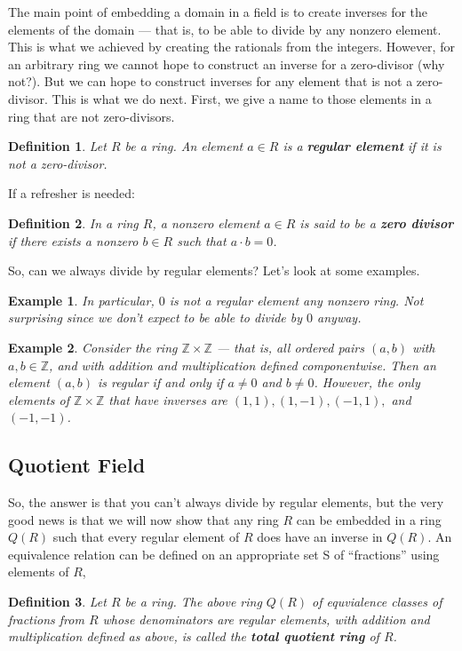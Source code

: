 \documentclass[12pt,reqno]{amsart}
\theoremstyle{plain}
\newtheorem{defi}{Definition}
\newtheorem{ex}{Example}
\newcommand{\zz}{\mathbb Z}
\begin{document}
The main point of embedding a domain in a field is to create inverses for the elements of the domain — that is, to be able to divide by any nonzero element. This is what we achieved by creating the rationals from the integers. However, for an arbitrary ring we cannot hope to construct an inverse for a zero-divisor (why not?). But we can hope to construct inverses for any element that is not a zero-divisor. This is what we do next. First, we give a name to those elements in a ring that are not zero-divisors.

\begin{defi} Let $R$ be a ring. An element $a \in R$ is a \textbf{regular element} if it is not a zero-divisor.
\end{defi} 

If a refresher is needed:
\begin{defi} In a ring $R$, a nonzero element $a\in R$ is said to be a \textbf{zero divisor} if there exists a nonzero $b \in R$ such that $a\cdot b = 0$.
\end{defi} 

 So, can we always divide by regular elements? Let's look at some examples.
 
\begin{ex} In particular, $0$ is not a regular element any nonzero ring. Not surprising since we don't expect to be able to divide by $0$ anyway. 
\end{ex} 
\begin{ex} Consider the ring $\zz \times \zz$ — that is, all ordered pairs $(a, b)$ with $a, b \in \zz$, and with addition and multiplication defined componentwise. Then an element $(a, b)$ is regular if and only if $a \neq 0$ and $b \neq 0$. However, the only elements of $\zz \times \zz$ that have inverses are $(1, 1), (1, -1), (-1, 1),$ and $(-1, -1)$.
\end{ex} 
\subsection{Quotient Field}
So, the answer is that you can't always divide by regular elements, but the very good news is that we will now show that any ring $R$ can be embedded in a ring $Q(R)$ such that every regular element of $R$ does have an inverse in $Q(R)$. An equivalence relation can be defined on an appropriate set S of ``fractions” using elements of $R$,
\begin{defi}
Let $R$ be a ring. The above ring $Q(R)$ of equvialence classes of fractions from $R$ whose denominators are regular elements, with addition and multiplication defined as above, is called the \textbf{total quotient ring} of $R$.
\end{defi}
\end{document}
